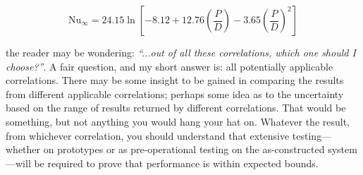 \begin{equation}
\text{Nu}_{\infty} = 24.15 \ln{\left[-8.12 + 12.76\left(\frac{P}{D}\right)-3.65 \left(\frac{P}{D} \right)^2  \right]}
\end{equation}

 the reader may be wondering: \emph{``...out of all these correlations, which one should I choose?''}.  A fair question, and my short answer is: all potentially applicable correlations. There may be some insight to be gained in comparing the results from different applicable correlations; perhaps some idea as to the uncertainty based on the range of results returned by different correlations.  That would be something, but not anything you would hang your hat on.  Whatever the result, from whichever correlation, you should understand that extensive testing---whether on prototypes or as pre-operational testing on the as-constructed system---will be required to prove that performance is within expected bounds.


